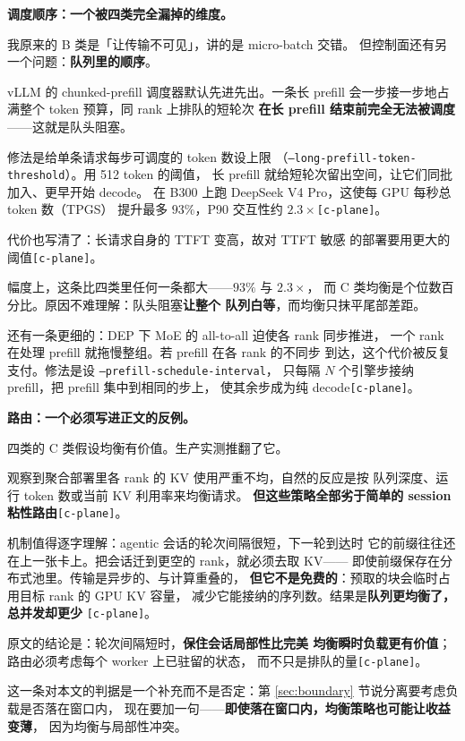 \noindent\textbf{调度顺序：一个被四类完全漏掉的维度。}

我原来的 B 类是「让传输不可见」，讲的是 micro-batch 交错。
但控制面还有另一个问题：\textbf{队列里的顺序}。

\noindent vLLM 的 chunked-prefill 调度器默认先进先出。一条长 prefill
会一步接一步地占满整个 token 预算，同 rank 上排队的短轮次
\textbf{在长 prefill 结束前完全无法被调度}——这就是队头阻塞。

\noindent 修法是给单条请求每步可调度的 token 数设上限
（\texttt{--long-prefill-token-threshold}）。用 512 token 的阈值，
长 prefill 就给短轮次留出空间，让它们同批加入、更早开始 decode。
在 B300 上跑 DeepSeek V4 Pro，这使每 GPU 每秒总 token 数（TPGS）
提升最多 $93\%$，P90 交互性约 $2.3\times$\texttt{[c-plane]}。

\noindent 代价也写清了：长请求自身的 TTFT 变高，故对 TTFT 敏感
的部署要用更大的阈值\texttt{[c-plane]}。

\noindent 幅度上，这条比四类里任何一条都大——$93\%$ 与 $2.3\times$，
而 C 类均衡是个位数百分比。原因不难理解：队头阻塞\textbf{让整个
队列白等}，而均衡只抹平尾部差距。

\noindent 还有一条更细的：DEP 下 MoE 的 all-to-all 迫使各 rank 同步推进，
一个 rank 在处理 prefill 就拖慢整组。若 prefill 在各 rank 的不同步
到达，这个代价被反复支付。修法是设 \texttt{--prefill-schedule-interval}，
只每隔 $N$ 个引擎步接纳 prefill，把 prefill 集中到相同的步上，
使其余步成为纯 decode\texttt{[c-plane]}。

\noindent\textbf{路由：一个必须写进正文的反例。}

\noindent 四类的 C 类假设均衡有价值。生产实测推翻了它。

\noindent 观察到聚合部署里各 rank 的 KV 使用严重不均，自然的反应是按
队列深度、运行 token 数或当前 KV 利用率来均衡请求。
\textbf{但这些策略全部劣于简单的 session 粘性路由}\texttt{[c-plane]}。

\noindent 机制值得逐字理解：agentic 会话的轮次间隔很短，下一轮到达时
它的前缀往往还在上一张卡上。把会话迁到更空的 rank，就必须去取 KV——
即使前缀保存在分布式池里。传输是异步的、与计算重叠的，
\textbf{但它不是免费的}：预取的块会临时占用目标 rank 的 GPU KV 容量，
减少它能接纳的序列数。结果是\textbf{队列更均衡了，总并发却更少}
\texttt{[c-plane]}。

\noindent 原文的结论是：轮次间隔短时，\textbf{保住会话局部性比完美
均衡瞬时负载更有价值}；路由必须考虑每个 worker 上已驻留的状态，
而不只是排队的量\texttt{[c-plane]}。

\noindent 这一条对本文的判据是一个补充而不是否定：第
\ref{sec:boundary} 节说分离要考虑负载是否落在窗口内，
现在要加一句——\textbf{即使落在窗口内，均衡策略也可能让收益变薄}，
因为均衡与局部性冲突。


